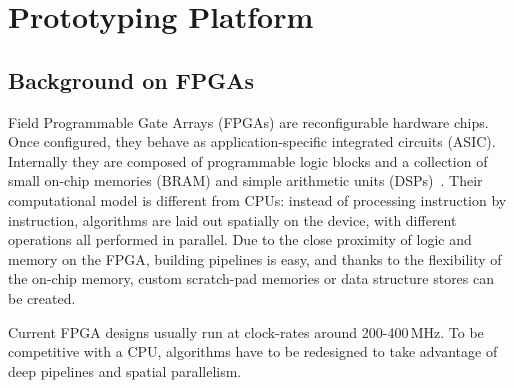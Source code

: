 \documentclass[11pt,dvipdfm]{article}
\begin{document}
 





\section{Prototyping Platform}
\label{sec:prototype-platform}
\subsection{Background on FPGAs}

Field Programmable Gate Arrays (FPGAs) are reconfigurable hardware chips. Once configured, they behave as application-specific integrated circuits (ASIC). Internally they are composed of programmable logic blocks and a collection of small on-chip memories (BRAM) and simple arithmetic units (DSPs)~\cite{jensFPGABook}. Their computational model is different from CPUs: instead of processing instruction by instruction, algorithms are laid out spatially on the device, with different operations all performed in parallel. Due to the close proximity of logic and memory on the FPGA, building pipelines is easy, and thanks to the flexibility of the on-chip memory, custom scratch-pad memories or data structure stores can be created.

Current FPGA designs usually run at clock-rates around 200-400\,MHz. To be competitive with a CPU, algorithms have to be redesigned to take advantage of deep pipelines and spatial parallelism. 
\end{document}
